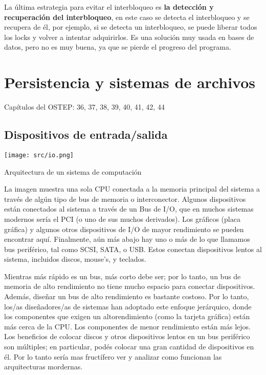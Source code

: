 \documentclass[openany]{book}
\begin{document}
\begin{itemize}
    La última estrategia para evitar el interbloqueo es \textbf{la detección y recuperación del interbloqueo}, en este caso se detecta el interbloqueo y se recupera de él, por ejemplo, si se detecta un interbloqueo, se puede liberar todos los locks y volver a intentar adquirirlos. Es una solución muy usada en bases de datos, pero no es muy buena, ya que se pierde el progreso del programa.
\end{itemize}

\newpage
\chapter{Persistencia y sistemas de archivos}

\begin{tcolorbox}[colback=black!5!white,colframe=black!75!black]
    Capítulos del OSTEP: 36, 37, 38, 39, 40, 41, 42, 44
\end{tcolorbox}

\section{Dispositivos de entrada/salida}
\begin{floatingfigure}[r]{0.5\textwidth}
    \texttt{[image: src/io.png]}
    \caption{Arquitectura de un sistema de computación}
\end{floatingfigure}

La imagen muestra una sola CPU conectada a la memoria principal del sistema a través de algún tipo de bus de memoria o interconector. Algunos dispositivos están conectados al sistema a través de un Bus de I/O, que en muchos sistemas modernos sería el PCI (o uno de sus muchos derivados). Los gráficos (placa gráfica) y algunos otros dispositivos de I/O de mayor rendimiento se pueden encontrar aquí. Finalmente, aún más abajo hay uno o más de lo que llamamos bus periférico, tal como SCSI, SATA, o USB. Estos conectan dispositivos lentos al sistema, incluidos discos, mouse’s, y teclados. 

\colorbox{yellow!20}{Mientras más rápido es un bus, más corto} debe ser; por lo tanto, un bus de memoria de alto rendimiento no tiene mucho espacio para conectar dispositivos. Además, diseñar un bus de alto rendimiento es bastante costoso. Por lo tanto, los/as diseñadores/as de sistemas han adoptado este enfoque jerárquico, donde los \colorbox{yellow!20}{componentes que exigen un alto}\newline \colorbox{yellow!20}{rendimiento} (como la tarjeta gráfica) \colorbox{yellow!20}{están más cerca} \colorbox{yellow!20}{de la CPU}. Los \colorbox{yellow!20}{componentes de menor rendimiento están más lejos}. Los beneficios de colocar discos y otros dispositivos lentos en un bus periférico son múltiples; en particular, podés colocar una gran cantidad de dispositivos en él. Por lo tanto sería mas fructífero ver y analizar como funcionan las arquitecturas mordernas. 
\end{document}
